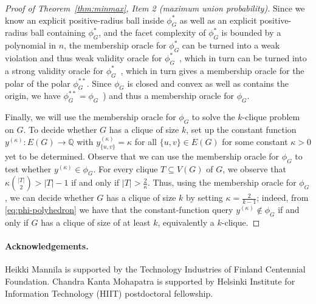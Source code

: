 \documentclass[11pt]{article}
\begin{document}
\begin{proof}[Proof of Theorem~\ref{thm:minmax}, Item 2 (maximum union probability)]
Since we know an explicit positive-radius ball inside $\phi_G^*$
as well as an explicit positive-radius ball containing $\phi_G^*$,
and the facet complexity of $\phi_G^*$ is bounded by a polynomial in $n$,
the membership oracle for $\phi_G^*$ can be turned into a weak violation
and thus weak validity oracle for 
$\phi_G^*$~\cite[Theorem~4.3.2]{GrotschelLS1993}, which in turn can be
turned into a strong validity oracle for 
$\phi_G^*$~\cite[Theorem~6.3.2]{GrotschelLS1993}, which 
in turn gives a membership oracle for the polar of the polar $\phi_G^{**}$. 
Since $\phi_G$ is closed and convex as well as contains the origin, 
we have $\phi_G^{**}=\phi_G$~\cite[Sect.~0.1]{GrotschelLS1993}) and 
thus a membership oracle for $\phi_G$. 

Finally, we will use the membership oracle for $\phi_G$ to solve 
the $k$-clique problem on $G$. 
To decide whether $G$ has a clique of size $k$, set up the constant function 
$y^{(\kappa)}:E(G)\rightarrow\mathbb{Q}$ with 
$y_{\{u,v\}}^{(\kappa)}=\kappa$ for all $\{u,v\}\in E(G)$ for some 
constant $\kappa>0$ 
yet to be determined. Observe that we can use the membership oracle 
for $\phi_G$ to test whether $y^{(\kappa)}\in\phi_G$. 
For every clique $T\subseteq V(G)$ of $G$, we observe that
$\kappa\binom{|T|}{2}>|T|-1$ if and only if $|T|>\frac{2}{\kappa}$. 
Thus, using the membership oracle for $\phi_G$, 
we can decide whether $G$ has a clique 
of size $k$ by setting $\kappa=\frac{2}{k-1}$; 
indeed, from \eqref{eq:phi-polyhedron} we have that 
the constant-function query $y^{(\kappa)}\notin\phi_G$ if and only if 
$G$ has a clique of size of at least $k$, equivalently a $k$-clique.
\end{proof}

\paragraph*{Acknowledgements.}

Heikki Mannila is supported by the Technology Industries of Finland Centennial Foundation. Chandra Kanta Mohapatra is supported by Helsinki Institute for Information Technology (HIIT) postdoctoral fellowship.





\appendix
\end{document}
